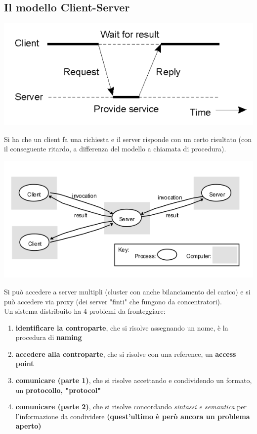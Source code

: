 \documentclass[a4paper,12pt, oneside]{book}
\begin{document}
\subsection{Il modello Client-Server}
\begin{center}
\includegraphics[scale=0.6]{img/cli2.png}
\end{center}
Si ha che un client fa una richiesta e il server risponde con un certo risultato (con il conseguente ritardo, a differenza del modello a chiamata di procedura).  
\begin{center}
\includegraphics[scale=2.6]{img/cli3.png}
\end{center}
Si può accedere a server multipli (cluster con anche bilanciamento del carico) e si può accedere via proxy (dei server "finti" che fungono da concentratori).\\
Un sistema distribuito ha 4 problemi da fronteggiare:
\begin{enumerate}
\item \textbf{identificare la controparte}, che si risolve assegnando un nome, è la procedura di \textbf{naming}
\item \textbf{accedere alla controparte}, che si risolve con una reference, un \textbf{access point}
\item \textbf{comunicare (parte 1)}, che si risolve accettando e condividendo un formato, un \textbf{protocollo, "protocol"}
\item \textbf{comunicare (parte 2)}, che si risolve concordando \textit{sintassi e semantica} per l'informazione da condividere \textbf{(quest'ultimo è però ancora un problema aperto)}
\end{enumerate}
\end{document}
